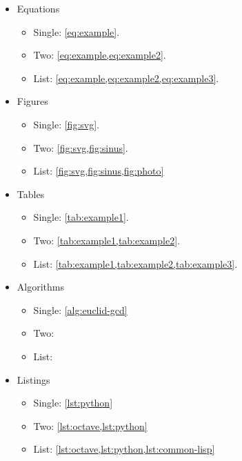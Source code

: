 \begin{itemize}
\item Equations
\begin{itemize}
  \item Single: \cref{eq:example}.
  \item Two: \cref{eq:example,eq:example2}.
  \item List: \cref{eq:example,eq:example2,eq:example3}.
\end{itemize}
\item Figures
\begin{itemize}
  \item Single: \cref{fig:svg}.
  \item Two: \cref{fig:svg,fig:sinus}.
  \item List: \cref{fig:svg,fig:sinus,fig:photo}
\end{itemize}
\item Tables
\begin{itemize}
  \item Single: \cref{tab:example1}.
  \item Two: \cref{tab:example1,tab:example2}.
  \item List: \cref{tab:example1,tab:example2,tab:example3}.
\end{itemize}
\item Algorithms
\begin{itemize}
  \item Single: \cref{alg:euclid-gcd}
  \item Two:
  \item List:
\end{itemize}
\item Listings
\begin{itemize}
  \item Single: \cref{lst:python}
  \item Two: \cref{lst:octave,lst:python}
  \item List: \cref{lst:octave,lst:python,lst:common-lisp}
\end{itemize} \end{itemize}

